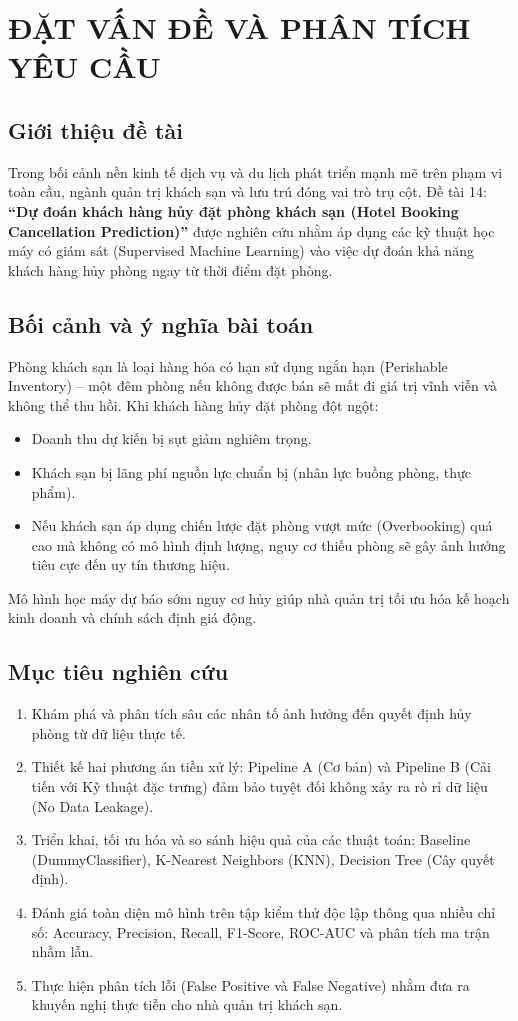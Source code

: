 \chapter{ĐẶT VẤN ĐỀ VÀ PHÂN TÍCH YÊU CẦU}

\section{Giới thiệu đề tài}
Trong bối cảnh nền kinh tế dịch vụ và du lịch phát triển mạnh mẽ trên phạm vi toàn cầu, ngành quản trị khách sạn và lưu trú đóng vai trò trụ cột. Đề tài 14: \textbf{``Dự đoán khách hàng hủy đặt phòng khách sạn (Hotel Booking Cancellation Prediction)''} được nghiên cứu nhằm áp dụng các kỹ thuật học máy có giám sát (Supervised Machine Learning) vào việc dự đoán khả năng khách hàng hủy phòng ngay từ thời điểm đặt phòng.

\section{Bối cảnh và ý nghĩa bài toán}
Phòng khách sạn là loại hàng hóa có hạn sử dụng ngắn hạn (Perishable Inventory) -- một đêm phòng nếu không được bán sẽ mất đi giá trị vĩnh viễn và không thể thu hồi. Khi khách hàng hủy đặt phòng đột ngột:
\begin{itemize}
    \item Doanh thu dự kiến bị sụt giảm nghiêm trọng.
    \item Khách sạn bị lãng phí nguồn lực chuẩn bị (nhân lực buồng phòng, thực phẩm).
    \item Nếu khách sạn áp dụng chiến lược đặt phòng vượt mức (Overbooking) quá cao mà không có mô hình định lượng, nguy cơ thiếu phòng sẽ gây ảnh hưởng tiêu cực đến uy tín thương hiệu.
\end{itemize}
Mô hình học máy dự báo sớm nguy cơ hủy giúp nhà quản trị tối ưu hóa kế hoạch kinh doanh và chính sách định giá động.

\section{Mục tiêu nghiên cứu}
\begin{enumerate}
    \item Khám phá và phân tích sâu các nhân tố ảnh hưởng đến quyết định hủy phòng từ dữ liệu thực tế.
    \item Thiết kế hai phương án tiền xử lý: Pipeline A (Cơ bản) và Pipeline B (Cải tiến với Kỹ thuật đặc trưng) đảm bảo tuyệt đối không xảy ra rò rỉ dữ liệu (No Data Leakage).
    \item Triển khai, tối ưu hóa và so sánh hiệu quả của các thuật toán: Baseline (DummyClassifier), K-Nearest Neighbors (KNN), Decision Tree (Cây quyết định).
    \item Đánh giá toàn diện mô hình trên tập kiểm thử độc lập thông qua nhiều chỉ số: Accuracy, Precision, Recall, F1-Score, ROC-AUC và phân tích ma trận nhầm lẫn.
    \item Thực hiện phân tích lỗi (False Positive và False Negative) nhằm đưa ra khuyến nghị thực tiễn cho nhà quản trị khách sạn.
\end{enumerate}

